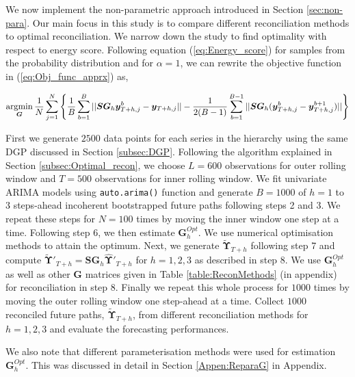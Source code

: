 \documentclass[12pt]{article}
\theoremstyle{definition}
\begin{document}
We now implement the non-parametric approach introduced in Section \ref{sec:non-para}. Our main focus in this study is to compare different reconciliation methods to optimal reconciliation. We narrow down the study to find optimality with respect to energy score. Following equation (\ref{eq:Energy_score}) for samples from the probability distribution and for $\alpha = 1$, we can rewrite the objective function in (\ref{eq:Obj_func_apprx}) as, 

\begin{equation}\label{eq:Obj_func_apprx_ES}
\operatornamewithlimits{argmin}_{\bm{G}} \frac{1}{N}\sum_{j=1}^{N}\left\{\frac{1}{B}\sum_{b=1}^{B}||\bm{SG}_h\bm{y}_{T+h,j}^b -\bm{y}_{T+h,j}||-\frac{1}{2(B-1)}\sum_{b=1}^{B-1}||\bm{SG}_h(\bm{y}_{T+h,j}^b -\bm{y}_{T+h,j}^{b+1})||\right\}
\end{equation}

First we generate $2500$ data points for each series in the hierarchy using the same DGP discussed in Section \ref{subsec:DGP}. Following the algorithm explained in Section \ref{subsec:Optimal_recon}, we choose $L=600$ observations for outer rolling window and $T=500$ observations for inner rolling window. We fit univariate ARIMA models using \verb|auto.arima()| function and generate $B=1000$ of $h=1$ to $3$ steps-ahead incoherent bootstrapped future paths following steps 2 and 3. We repeat these steps for $N=100$ times by moving the inner window one step at a time. Following step 6, we then estimate $\bm{G}_h^{Opt}$. We use numerical optimisation methods to attain the optimum. Next, we generate $\tilde{\bm{\Upsilon}}_{T+h}$ following step 7 and compute $\tilde{\bm{\Upsilon}}'_{T+h} = \bm{SG}_h\hat{\bm{\Upsilon}}'_{T+h}$ for $h=1,2,3$ as described in step 8. We use $\bm{G}_h^{Opt}$ as well as other $\bm{G}$ matrices given in Table \ref{table:ReconMethods} (in appendix) for reconciliation in step 8. Finally we repeat this whole process for $1000$ times by moving the outer rolling window one step-ahead at a time. Collect $1000$ reconciled future paths, $\tilde{\bm{\Upsilon}}_{T+h}$, from different reconciliation methods for $h=1,2,3$ and evaluate the forecasting performances.

We also note that different parameterisation methods were used for estimation $\bm{G}_h^{Opt}$. This was discussed in detail in Section \ref{Appen:ReparaG} in Appendix. 
\end{document}
